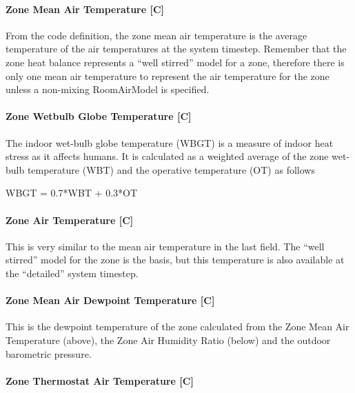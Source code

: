 \paragraph{Zone Mean Air Temperature {[}C{]}}\label{zone-mean-air-temperature-c}

From the code definition, the zone mean air temperature is the average temperature of the air temperatures at the system timestep. Remember that the zone heat balance represents a ``well stirred'' model for a zone, therefore there is only one mean air temperature to represent the air temperature for the zone unless a non-mixing RoomAirModel is specified.

\paragraph{Zone Wetbulb Globe Temperature {[}C{]}}\label{zone-wetbulb-globe-temperature-c}

The indoor wet-bulb globe temperature (WBGT) is a measure of indoor heat stress as it affects humans.
It is calculated as a weighted average of the zone wet-bulb temperature (WBT) and the operative temperature (OT) as follows

WBGT = 0.7*WBT + 0.3*OT

\paragraph{Zone Air Temperature {[}C{]}}\label{zone-air-temperature-c}

This is very similar to the mean air temperature in the last field. The ``well stirred'' model for the zone is the basis, but this temperature is also available at the ``detailed'' system timestep.

\paragraph{Zone Mean Air Dewpoint Temperature {[}C{]}}\label{zone-mean-air-dewpoint-temperature-c}

This is the dewpoint temperature of the zone calculated from the Zone Mean Air Temperature (above), the Zone Air Humidity Ratio (below) and the outdoor barometric pressure.

\paragraph{Zone Thermostat Air Temperature {[}C{]}}\label{zone-thermostat-air-temperature-c}

